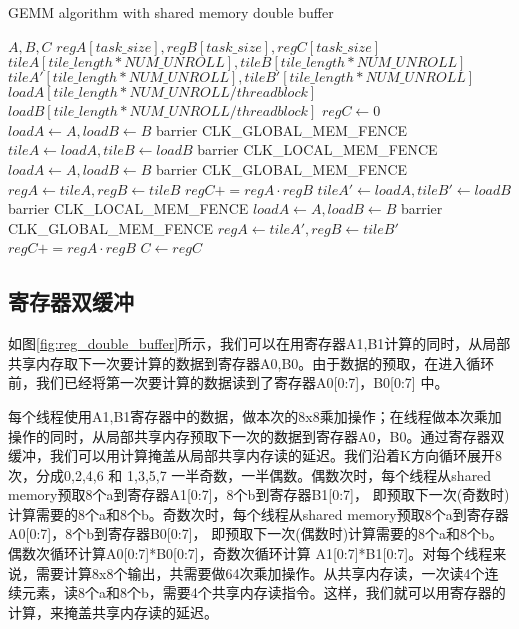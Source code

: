 \begin{algorithm}[htbp]
	\small
	\caption{GEMM algorithm with shared memory double buffer}\label{alg:gemm_sharedmem}
	\begin{algorithmic}[1]
		\State $A, B, C$
		\State $regA[task\_size],regB[task\_size],regC[task\_size]$
		\State $tileA[tile\_length*NUM\_UNROLL],tileB[tile\_length*NUM\_UNROLL]$
		\State $tileA'[tile\_length*NUM\_UNROLL],tileB'[tile\_length*NUM\_UNROLL]$
		\State $loadA[tile\_length*NUM\_UNROLL/threadblock]$
		\State $loadB[tile\_length*NUM\_UNROLL/threadblock]$
		\State $regC \gets 0$
		\State $loadA \gets A, loadB \gets B $
		\State barrier CLK\_GLOBAL\_MEM\_FENCE
				\State $tileA \gets loadA, tileB \gets loadB$
				\State barrier CLK\_LOCAL\_MEM\_FENCE
				\State $loadA \gets A, loadB \gets B $
				\State barrier CLK\_GLOBAL\_MEM\_FENCE
						\State $regA \gets tileA, regB \gets tileB$
						\State $regC += regA \cdot regB$
					\EndFor
			\Else  
				\State $tileA' \gets loadA, tileB' \gets loadB$
				\State barrier CLK\_LOCAL\_MEM\_FENCE
				\State $loadA \gets A, loadB \gets B $
				\State barrier CLK\_GLOBAL\_MEM\_FENCE
						\State $regA \gets tileA', regB \gets tileB'$
						\State $regC += regA \cdot regB$
					\EndFor
			\EndIf
		\EndFor\label{gemmendfor}
		\State $C \gets regC$
	\end{algorithmic}
\end{algorithm}

\subsection{寄存器双缓冲}
如图\ref{fig:reg_double_buffer}所示，我们可以在用寄存器A1,B1计算的同时，从局部共享内存取下一次要计算的数据到寄存器A0,B0。由于数据的预取，在进入循环前，我们已经将第一次要计算的数据读到了寄存器A0[0:7]，B0[0:7] 中。

每个线程使用A1,B1寄存器中的数据，做本次的8x8乘加操作；在线程做本次乘加操作的同时，从局部共享内存预取下一次的数据到寄存器A0，B0。通过寄存器双缓冲，我们可以用计算掩盖从局部共享内存读的延迟。我们沿着K方向循环展开8次，分成0,2,4,6 和 1,3,5,7 一半奇数，一半偶数。偶数次时，每个线程从shared memory预取8个a到寄存器A1[0:7]，8个b到寄存器B1[0:7]， 即预取下一次(奇数时)计算需要的8个a和8个b。奇数次时，每个线程从shared memory预取8个a到寄存器A0[0:7]，8个b到寄存器B0[0:7]， 即预取下一次(偶数时)计算需要的8个a和8个b。偶数次循环计算A0[0:7]*B0[0:7]，奇数次循环计算 A1[0:7]*B1[0:7]。对每个线程来说，需要计算8x8个输出，共需要做64次乘加操作。从共享内存读，一次读4个连续元素，读8个a和8个b，需要4个共享内存读指令。这样，我们就可以用寄存器的计算，来掩盖共享内存读的延迟。

